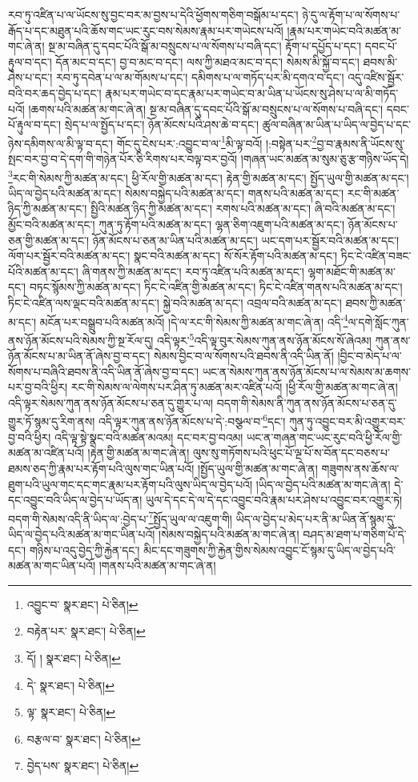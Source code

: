 རབ་ཏུ་འཛིན་པ་ལ་ཡོངས་སུ་བྱང་བར་མ་བྱས་པ་དེའི་ཕྱོགས་གཅིག་བསྒོམ་པ་དང་། ཉེ་དུ་ལ་རྟོག་པ་ལ་སོགས་པ་རྒོད་པ་དང་མཐུན་པའི་ཆོས་གང་ཡང་རུང་བས་སེམས་རྣམ་པར་གཡེངས་པའོ། །རྣམ་པར་གཡེང་བའི་མཚན་མ་གང་ཞེ་ན། སྔ་མ་བཞིན་དུ་དབང་པོའི་སྒོ་མ་བསྲུངས་པ་ལ་སོགས་པ་བཞི་དང་། རྟོག་པ་དཔྱོད་པ་དང་། དབང་པོ་རྟུལ་བ་དང་། དོན་མང་བ་དང་། བྱ་བ་མང་བ་དང་། ལས་ཀྱི་མཐའ་མང་བ་དང་། སེམས་མི་སྐྱོ་བ་དང་། ཐབས་མི་ཤེས་པ་དང་། རབ་ཏུ་དབེན་པ་ལ་མ་གོམས་པ་དང་། དམིགས་པ་ལ་གཏོད་པར་མི་དགའ་བ་དང་། འདུ་འཛིས་སྦྱོར་བའི་བར་ཆད་བྱེད་པ་དང་། རྣམ་པར་གཡེང་བ་དང་རྣམ་པར་གཡེང་བ་མ་ཡིན་པ་ཡོངས་སུ་ཤེས་པ་ལ་མི་གཏོད་པའོ། །ཆགས་པའི་མཚན་མ་གང་ཞེ་ན། སྔ་མ་བཞིན་དུ་དབང་པོའི་སྒོ་མ་བསྲུངས་པ་ལ་སོགས་པ་བཞི་དང་། དབང་པོ་རྟུལ་བ་དང་། སྲེད་པ་ལ་སྤྱོད་པ་དང་། ཉོན་མོངས་པའི་ཤས་ཆེ་བ་དང་། ཚུལ་བཞིན་མ་ཡིན་པ་ཡིད་ལ་བྱེད་པ་དང་ཉེས་དམིགས་ལ་མི་ལྟ་བ་དང་། གོང་དུ་ངེས་པར་:འབྱུང་བ་ལ་\footnote{འབྱུང་བ་  སྣར་ཐང་།  པེ་ཅིན། }མི་ལྟ་བའོ། །:བསྟེན་པར་\footnote{བརྟེན་པར་  སྣར་ཐང་།  པེ་ཅིན། }བྱ་བ་རྣམས་ནི་ཡོངས་སུ་སྤང་བར་བྱ་བ་དེ་དག་གི་གཉེན་པོར་ཅི་རིགས་པར་བལྟ་བར་བྱའོ། །གཞན་ཡང་མཚན་མ་སུམ་ཅུ་རྩ་གཉིས་ཡོད་དེ། \footnote{དོ། །   སྣར་ཐང་།  པེ་ཅིན། }རང་གི་སེམས་ཀྱི་མཚན་མ་དང་། ཕྱི་རོལ་གྱི་མཚན་མ་དང་། རྟེན་གྱི་མཚན་མ་དང་། སྤྱོད་ཡུལ་གྱི་མཚན་མ་དང་། ཡིད་ལ་བྱེད་པའི་མཚན་མ་དང་། སེམས་བསྐྱེད་པའི་མཚན་མ་དང་། གནས་པའི་མཚན་མ་དང་། རང་གི་མཚན་ཉིད་ཀྱི་མཚན་མ་དང་། སྤྱིའི་མཚན་ཉིད་ཀྱི་མཚན་མ་དང་། རགས་པའི་མཚན་མ་དང་། ཞི་བའི་མཚན་མ་དང་། མྱོང་བའི་མཚན་མ་དང་། ཀུན་ཏུ་རྟོག་པའི་མཚན་མ་དང་། ལྷན་ཅིག་འཇུག་པའི་མཚན་མ་དང་། ཉོན་མོངས་པ་ཅན་གྱི་མཚན་མ་དང་། ཉོན་མོངས་པ་ཅན་མ་ཡིན་པའི་མཚན་མ་དང་། ཡང་དག་པར་སྦྱོར་བའི་མཚན་མ་དང་། ལོག་པར་སྦྱོར་བའི་མཚན་མ་དང་། སྣང་བའི་མཚན་མ་དང་། སོ་སོར་རྟོག་པའི་མཚན་མ་དང་། ཏིང་ངེ་འཛིན་བཟང་པོའི་མཚན་མ་དང་། ཞི་གནས་ཀྱི་མཚན་མ་དང་། རབ་ཏུ་འཛིན་པའི་མཚན་མ་དང་། ལྷག་མཐོང་གི་མཚན་མ་དང་། བཏང་སྙོམས་ཀྱི་མཚན་མ་དང་། ཏིང་ངེ་འཛིན་གྱི་མཚན་མ་དང་། ཏིང་ངེ་འཛིན་གནས་པའི་མཚན་མ་དང་། ཏིང་ངེ་འཛིན་ལས་ལྡང་བའི་མཚན་མ་དང་། སྐྱེ་བའི་མཚན་མ་དང་། འབྲལ་བའི་མཚན་མ་དང་། ཐབས་ཀྱི་མཚན་མ་དང་། མངོན་པར་བསྒྲུབ་པའི་མཚན་མའོ། །དེ་ལ་རང་གི་སེམས་ཀྱི་མཚན་མ་གང་ཞེ་ན། འདི་\footnote{དེ་  སྣར་ཐང་།  པེ་ཅིན། }ལ་དགེ་སློང་ཀུན་ནས་ཉོན་མོངས་པའི་སེམས་ཀྱི་སྔ་རོལ་དུ། འདི་ལྟར་\footnote{ལྟ་  སྣར་ཐང་།  པེ་ཅིན། }འདི་ལྟ་བུར་སེམས་ཀུན་ནས་ཉོན་མོངས་སོ་ཞེའམ། ཀུན་ནས་ཉོན་མོངས་པ་མ་ཡིན་ནོ་ཞེས་བྱ་བ་དང་། སེམས་བྱིང་བ་ལ་སོགས་པའི་ཐབས་ནི་འདི་ཡིན་ནོ། །བྱིང་བ་མེད་པ་ལ་སོགས་པ་བཞིའི་ཐབས་ནི་འདི་ཡིན་ནོ་ཞེས་བྱ་བ་དང་། ཡང་ན་སེམས་ཀུན་ནས་ཉོན་མོངས་པ་ལ་སེམས་མ་ཆགས་པར་བྱ་བའི་ཕྱིར། རང་གི་སེམས་ལ་ལེགས་པར་ཤིན་ཏུ་མཚན་མར་འཛིན་པའོ། །ཕྱི་རོལ་གྱི་མཚན་མ་གང་ཞེ་ན། འདི་ལྟར་སེམས་ཀུན་ནས་ཉོན་མོངས་པ་ཅན་དུ་གྱུར་པ་ལ། བདག་གི་སེམས་ནི་ཀུན་ནས་ཉོན་མོངས་པ་ཅན་དུ་གྱུར་ཏོ་སྙམ་དུ་རིག་ནས། འདི་ལྟར་ཀུན་ནས་ཉོན་མོངས་པ་དེ་:བསྩལ་བ་\footnote{བརྩལ་བ་  སྣར་ཐང་།  པེ་ཅིན། }དང་། ཀུན་ཏུ་འབྱུང་བར་མི་འགྱུར་བར་བྱ་བའི་ཕྱིར། འདི་ལྟ་སྟེ་སྣང་བའི་མཚན་མའམ། དང་བར་བྱ་བའམ། ཡང་ན་གཞན་གང་ཡང་རུང་བའི་ཕྱི་རོལ་གྱི་མཚན་མ་འཛིན་པའོ། །རྟེན་གྱི་མཚན་མ་གང་ཞེ་ན། ལུས་སུ་གཏོགས་པའི་ཕུང་པོ་ལྔ་པོ་ས་བོན་དང་བཅས་པ་ཐམས་ཅད་ཀྱི་རྣམ་པར་རྟོག་པའི་ལུས་གང་ཡིན་པའོ། །སྤྱོད་ཡུལ་གྱི་མཚན་མ་གང་ཞེ་ན། གཟུགས་ནས་ཆོས་ལ་ཐུག་པའི་ཡུལ་གང་དང་གང་རྣམ་པར་རྟོག་པའི་ལུས་ཡིད་ལ་བྱེད་པའོ། །ཡིད་ལ་བྱེད་པའི་མཚན་མ་གང་ཞེ་ན། དེ་དང་འབྱུང་བའི་ཡིད་ལ་བྱེད་པ་ཡོད་ན། ཡུལ་དེ་དང་དེ་ལ་དེ་དང་འབྱུང་བའི་རྣམ་པར་ཤེས་པ་འབྱུང་བར་འགྱུར་ཏེ། བདག་གི་སེམས་འདི་ནི་ཡིད་ལ་:བྱེད་པ་\footnote{བྱེད་པས་  སྣར་ཐང་།  པེ་ཅིན། }སྤྱོད་ཡུལ་ལ་འཇུག་གི། ཡིད་ལ་བྱེད་པ་མེད་པར་ནི་མ་ཡིན་ནོ་སྙམ་དུ་ཡིད་ལ་བྱེད་པའི་མཚན་མ་གང་ཡིན་པའོ། །སེམས་བསྐྱེད་པའི་མཚན་མ་གང་ཞེ་ན། བཤད་མ་ཐག་པ་གཅིག་པོ་དེ་དང་། གཉིས་པ་འདུ་བྱེད་ཀྱི་རྐྱེན་དང་། མིང་དང་གཟུགས་ཀྱི་རྐྱེན་གྱིས་སེམས་འབྱུང་ངོ་སྙམ་དུ་ཡིད་ལ་བྱེད་པའི་མཚན་མ་གང་ཡིན་པའོ། །གནས་པའི་མཚན་མ་གང་ཞེ་ན། 